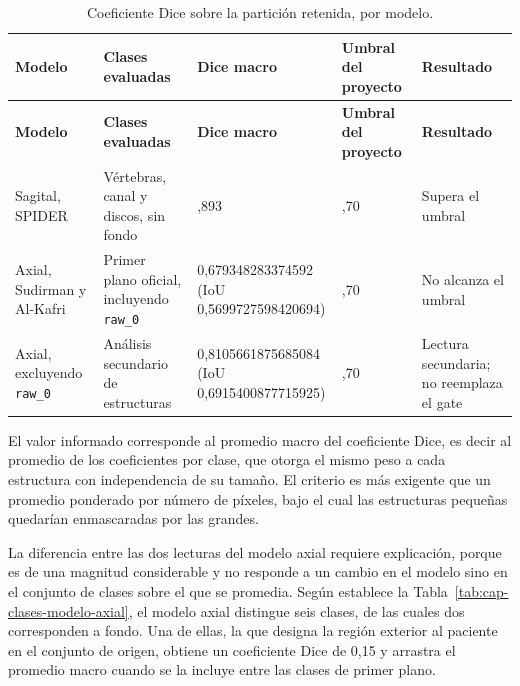 {\scriptsize
\setlength{\LTleft}{0pt}
\setlength{\LTright}{0pt}
\setlength{\tabcolsep}{3pt}
\renewcommand{\arraystretch}{1.18}
\begin{longtable}{>{\raggedright\arraybackslash}p{} >{\raggedright\arraybackslash}p{} >{\raggedright\arraybackslash}p{} >{\raggedright\arraybackslash}p{} >{\raggedright\arraybackslash}p{}}
\caption{Coeficiente Dice sobre la partición retenida, por modelo.}\label{tab:res-dice-modelos}\\
\hline
\textbf{Modelo} & \textbf{Clases evaluadas} & \textbf{Dice macro} & \textbf{Umbral del proyecto} & \textbf{Resultado} \\
\hline
\endfirsthead
\hline
\textbf{Modelo} & \textbf{Clases evaluadas} & \textbf{Dice macro} & \textbf{Umbral del proyecto} & \textbf{Resultado} \\
\hline
\endhead
\hline
\endfoot
Sagital, SPIDER & Vértebras, canal y discos, sin fondo & 0,893 & 0,70 & Supera el umbral \\
Axial, Sudirman y Al-Kafri & Primer plano oficial, incluyendo \texttt{raw\_0} & \shortstack[l]{0,679348283374592\\(IoU 0,5699727598420694)} & 0,70 & No alcanza el umbral \\
Axial, excluyendo \texttt{raw\_0} & Análisis secundario de estructuras & \shortstack[l]{0,8105661875685084\\(IoU 0,6915400877715925)} & 0,70 & Lectura secundaria; no reemplaza el gate \\
\hline
\end{longtable}
}

El valor informado corresponde al promedio macro del coeficiente Dice, es decir al promedio de los coeficientes por clase, que otorga el mismo peso a cada estructura con independencia de su tamaño. El criterio es más exigente que un promedio ponderado por número de píxeles, bajo el cual las estructuras pequeñas quedarían enmascaradas por las grandes.

La diferencia entre las dos lecturas del modelo axial requiere explicación, porque es de una magnitud considerable y no responde a un cambio en el modelo sino en el conjunto de clases sobre el que se promedia. Según establece la Tabla~\ref{tab:cap-clases-modelo-axial}, el modelo axial distingue seis clases, de las cuales dos corresponden a fondo. Una de ellas, la que designa la región exterior al paciente en el conjunto de origen, obtiene un coeficiente Dice de 0,15 y arrastra el promedio macro cuando se la incluye entre las clases de primer plano.

